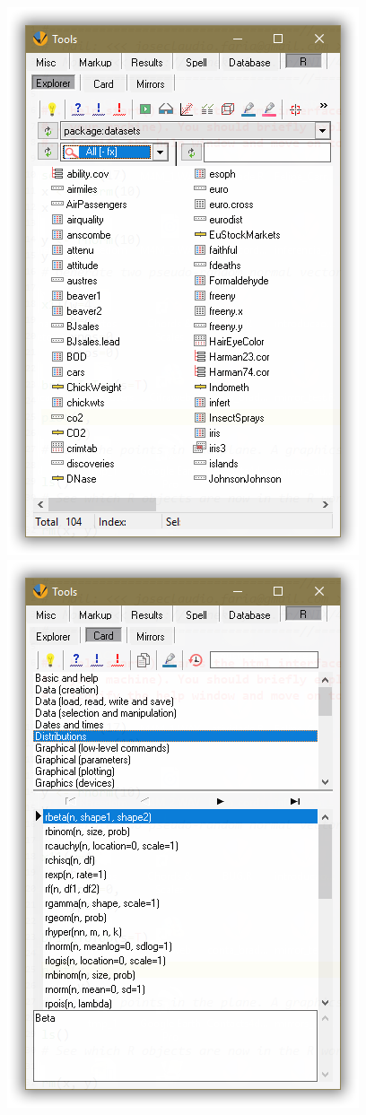 \begin{figure}[H]
  \includegraphics[scale=0.35]{./res/tools_r_explorer.png}~~
  \includegraphics[scale=0.35]{./res/tools_r_card.png}~~

\end{figure}

